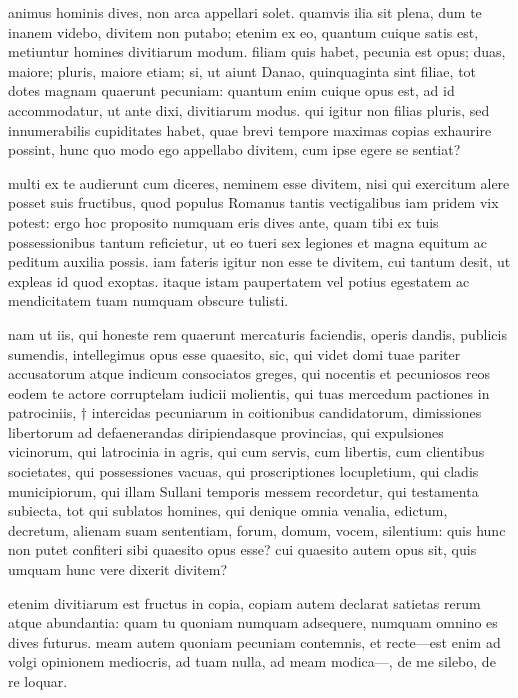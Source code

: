  animus hominis dives, non arca appellari solet. quamvis ilia sit plena, dum te inanem videbo, divitem non putabo; etenim ex eo, quantum cuique satis est, metiuntur homines divitiarum modum. filiam quis habet, pecunia est opus; duas, maiore; pluris, maiore etiam; si, ut aiunt Danao, quinquaginta sint filiae, tot dotes magnam quaerunt pecuniam: quantum enim cuique opus est, ad id accommodatur, ut ante dixi, divitiarum modus. qui igitur non filias pluris, sed innumerabilis cupiditates habet, quae brevi tempore maximas copias exhaurire possint, hunc quo modo ego appellabo divitem, cum ipse egere se sentiat?

 multi ex te audierunt cum diceres, neminem esse divitem, nisi qui exercitum alere posset suis fructibus, quod populus Romanus tantis vectigalibus iam pridem vix potest: ergo hoc proposito numquam eris dives ante, quam tibi ex tuis possessionibus tantum reficietur, ut eo tueri sex legiones et magna equitum ac peditum auxilia possis. iam fateris igitur non esse te divitem, cui tantum desit, ut expleas id quod exoptas. itaque istam paupertatem vel potius egestatem ac mendicitatem tuam numquam obscure tulisti.

 nam ut iis, qui honeste rem quaerunt mercaturis faciendis, operis dandis, publicis sumendis, intellegimus opus esse quaesito, sic, qui videt domi tuae pariter accusatorum atque indicum consociatos greges, qui nocentis et pecuniosos reos eodem te actore corruptelam iudicii molientis, qui tuas mercedum pactiones in patrociniis, † intercidas pecuniarum in coitionibus candidatorum, dimissiones libertorum ad defaenerandas diripiendasque provincias, qui expulsiones vicinorum, qui latrocinia in agris, qui cum servis, cum libertis, cum clientibus societates, qui possessiones vacuas, qui proscriptiones locupletium, qui cladis municipiorum, qui illam Sullani temporis messem recordetur, qui testamenta subiecta, tot qui sublatos homines, qui denique omnia venalia, edictum, decretum, alienam suam sententiam, forum, domum, vocem, silentium: quis hunc non putet confiteri sibi quaesito opus esse? cui quaesito autem opus sit, quis umquam hunc vere dixerit divitem?

 etenim divitiarum est fructus in copia, copiam autem declarat satietas rerum atque abundantia: quam tu quoniam numquam adsequere, numquam omnino es dives futurus. meam autem quoniam pecuniam contemnis, et recte—est enim ad volgi opinionem mediocris, ad tuam nulla, ad meam modica—, de me silebo, de re loquar.

